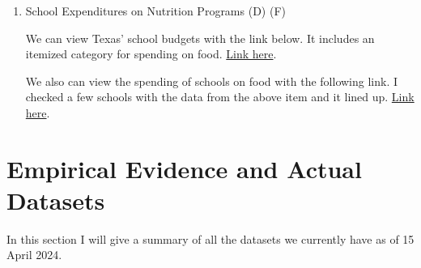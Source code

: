 \documentclass[12pt]{article}
\begin{document}
\begin{enumerate}
\begin{enumerate}
		\item School Expenditures on Nutrition Programs (D) (F)
		
		We can view Texas' school budgets with the link below. It includes an itemized category for spending on food. \href{https://rptsvr1.tea.texas.gov/school.finance/forecasting/financial_reports/1516_FinBudRep.html}{Link here}.
		
		We also can view the spending of schools on food with the following link. I checked a few schools with the data from the above item and it lined up. \href{https://tea.texas.gov/finance-and-grants/state-funding/state-funding-reports-and-data/peims-single-file-financial-data-downloads}{Link here}.
		
		
	\end{enumerate}


\end{enumerate}
	

\section{Empirical Evidence and Actual Datasets}

In this section I will give a summary of all the datasets we currently have as of 15 April 2024.
\end{document}
